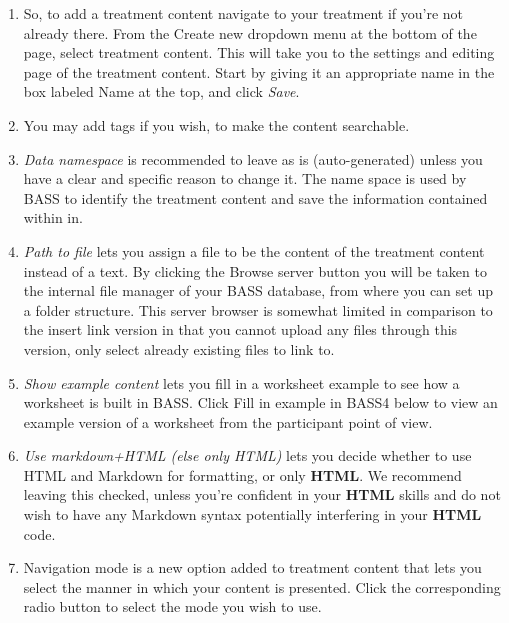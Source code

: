 \documentclass[
]{book}
\providecommand{\tightlist}{%
  \setlength{\itemsep}{0pt}\setlength{\parskip}{0pt}}
\begin{document}
\begin{enumerate}
\def\labelenumi{\arabic{enumi}.}
\tightlist
\item
  So, to add a treatment content navigate to your treatment if you're not already there. From the Create new dropdown menu at the bottom of the page, select treatment content. This will take you to the settings and editing page of the treatment content. Start by giving it an appropriate name in the box labeled Name at the top, and click \emph{Save}.
\item
  You may add tags if you wish, to make the content searchable.
\item
  \emph{Data namespace} is recommended to leave as is (auto-generated) unless you have a clear and specific reason to change it. The name space is used by BASS to identify the treatment content and save the information contained within in.
\item
  \emph{Path to file} lets you assign a file to be the content of the treatment content instead of a text. By clicking the Browse server button you will be taken to the internal file manager of your BASS database, from where you can set up a folder structure. This server browser is somewhat limited in comparison to the insert link version in that you cannot upload any files through this version, only select already existing files to link to.
\item
  \emph{Show example content} lets you fill in a worksheet example to see how a worksheet is built in BASS. Click Fill in example in BASS4 below to view an example version of a worksheet from the participant point of view.
\item
  \emph{Use markdown+HTML (else only HTML)} lets you decide whether to use HTML and Markdown for formatting, or only \textbf{HTML}. We recommend leaving this checked, unless you're confident in your \textbf{HTML} skills and do not wish to have any Markdown syntax potentially interfering in your \textbf{HTML} code.
\item
  Navigation mode is a new option added to treatment content that lets you select the manner in which your content is presented. Click the corresponding radio button to select the mode you wish to use.


\end{enumerate}
\end{document}
